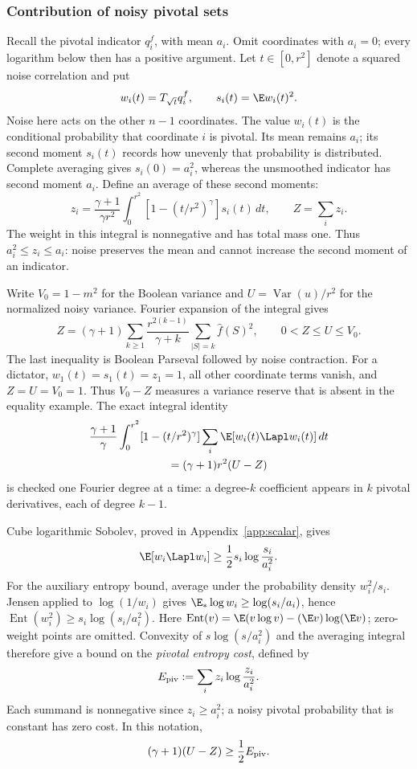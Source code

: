 \subsubsection{Contribution of noisy pivotal sets}

Recall the pivotal indicator \(q_i^f\), with mean \(a_i\).
Omit coordinates with \(a_i=0\); every logarithm below then has a
positive argument.
Let \(t\in[0,r^2]\) denote a squared noise correlation and put
\[
 w_i(t)=T_{\sqrt t}q_i^f,\qquad s_i(t)=\E w_i(t)^2.
\]
Noise here acts on the other \(n-1\) coordinates.
The value \(w_i(t)\) is the conditional probability that coordinate
\(i\) is pivotal. Its mean remains \(a_i\); its second moment
\(s_i(t)\) records how unevenly that probability is distributed.
Complete averaging gives \(s_i(0)=a_i^2\), whereas the unsmoothed
indicator has second moment \(a_i\).
Define an average of these second moments:
\[
 z_i=\frac{\gamma+1}{\gamma r^2}
       \int_0^{r^2}[1-(t/r^2)^\gamma]s_i(t)\,dt,
 \qquad Z=\sum_i z_i.
\]
The weight in this integral is nonnegative and has total mass one.
Thus \(a_i^2\le z_i\le a_i\): noise preserves the mean and cannot
increase the second moment of an indicator.

Write \(V_0=1-m^2\) for the Boolean variance and
\(U=\operatorname{Var}(u)/r^2\) for the normalized noisy variance.
Fourier expansion of the integral gives
\[
 Z=(\gamma+1)\sum_{k\ge1}
       \frac{r^{2(k-1)}}{\gamma+k}
       \sum_{|S|=k}\widehat f(S)^2,
 \qquad 0<Z\le U\le V_0.
\]
The last inequality is Boolean Parseval followed by noise contraction.
For a dictator, \(w_1(t)=s_1(t)=z_1=1\), all other
coordinate terms vanish, and \(Z=U=V_0=1\). Thus \(V_0-Z\)
measures a variance reserve that is absent in the equality example.
The exact integral identity
\begin{align*}
 &\frac{\gamma+1}{\gamma}
 \int_0^{r^2}[1-(t/r^2)^\gamma]
       \sum_i\E[w_i(t)\Lapl w_i(t)]\,dt\\
 &\hspace{7em}=(\gamma+1)r^2(U-Z)
\end{align*}
is checked one Fourier degree at a time: a degree-\(k\) coefficient
appears in \(k\) pivotal derivatives, each of degree \(k-1\).

Cube logarithmic Sobolev, proved in Appendix~\ref{app:scalar}, gives
\[
 \E[w_i\Lapl w_i]\ge
       \frac12 s_i\log\frac{s_i}{a_i^2}.
\]
For the auxiliary entropy bound, average under the probability
density \(w_i^2/s_i\). Jensen applied to \(\log(1/w_i)\) gives
\(\E_*\log w_i\ge\log(s_i/a_i)\), hence
\(\operatorname{Ent}(w_i^2)\ge s_i\log(s_i/a_i^2)\).
Here \(\operatorname{Ent}(v)=\E(v\log v)-(\E v)\log(\E v)\);
zero-weight points are omitted. Convexity of \(s\log(s/a_i^2)\)
and the averaging integral therefore give a bound on the
\emph{pivotal entropy cost}, defined by
\[
 E_{\rm piv}:=\sum_i z_i\log\frac{z_i}{a_i^2}.
\]
Each summand is nonnegative since \(z_i\ge a_i^2\); a noisy pivotal
probability that is constant has zero cost. In this notation,
\begin{equation}
 (\gamma+1)(U-Z)\ge\frac12 E_{\rm piv}.
 \label{eq:pivotal-entropy}
\end{equation}

